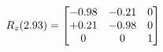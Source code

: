\documentclass[preview]{standalone}
\begin{document}
\begin{align*}
\special{dvisvgm:raw <g id='unique000'>}R_{z}(2.93) = \begin{bmatrix}-0.98 & -0.21 & 0 \\+0.21 & -0.98 & 0 \\0 & 0 & 1\end{bmatrix}\special{dvisvgm:raw </g>}
\end{align*}
\end{document}
